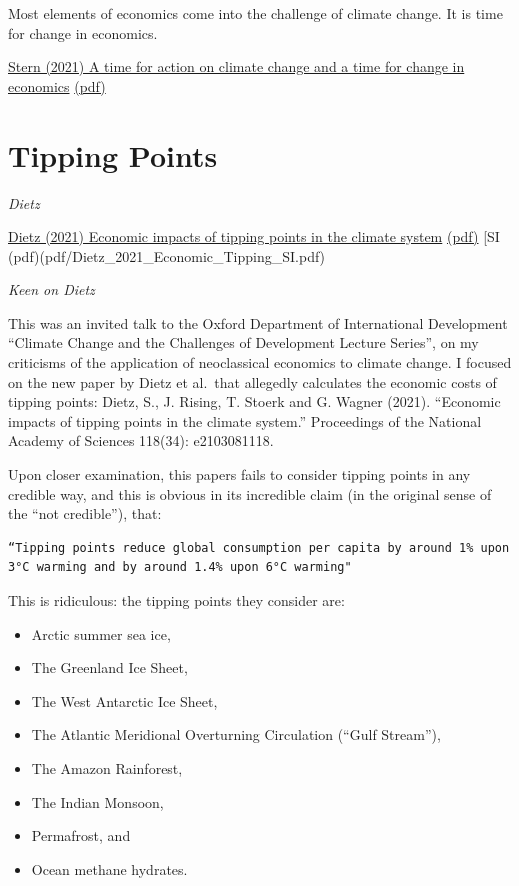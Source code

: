 \documentclass[
]{book}
\begin{document}
Most elements of economics come into the challenge of climate change.
It is time for change in economics.

\href{https://www.lse.ac.uk/granthaminstitute/publication/a-time-for-action-on-climate-change-and-a-time-for-change-in-economics/}{Stern (2021) A time for action on climate change and a time for change in economics}
\href{pdf/Stern_2021_Time_for_Change_in_Economics.pdf}{(pdf)}

\hypertarget{tipping-points}{%
\section{Tipping Points}\label{tipping-points}}

\emph{Dietz}

\href{https://doi.org/10.1073/pnas.2103081118}{Dietz (2021) Economic impacts of tipping points in the climate system}
\href{pdf/Dietz_2021_Economic_Tipping.pdf}{(pdf)}
{[}SI (pdf)(pdf/Dietz\_2021\_Economic\_Tipping\_SI.pdf)

\emph{Keen on Dietz}

This was an invited talk to the Oxford Department of International Development ``Climate Change and the Challenges of Development Lecture Series'', on my criticisms of the application of neoclassical economics to climate change. I focused on the new paper by Dietz et al.~that allegedly calculates the economic costs of tipping points: Dietz, S., J. Rising, T. Stoerk and G. Wagner (2021). ``Economic impacts of tipping points in the climate system.'' Proceedings of the National Academy of Sciences 118(34): e2103081118.

Upon closer examination, this papers fails to consider tipping points in any credible way, and this is obvious in its incredible claim (in the original sense of the ``not credible''), that:

\begin{verbatim}
“Tipping points reduce global consumption per capita by around 1% upon 3°C warming and by around 1.4% upon 6°C warming"
\end{verbatim}

This is ridiculous: the tipping points they consider are:

\begin{itemize}
\item
  Arctic summer sea ice,
\item
  The Greenland Ice Sheet,
\item
  The West Antarctic Ice Sheet,
\item
  The Atlantic Meridional Overturning Circulation (``Gulf Stream''),
\item
  The Amazon Rainforest,
\item
  The Indian Monsoon,
\item
  Permafrost, and
\item
  Ocean methane hydrates.
\end{itemize}
\end{document}
